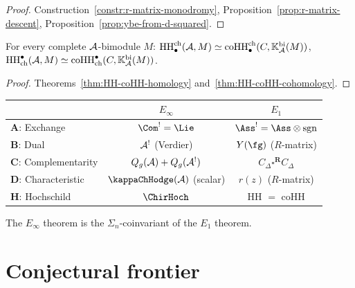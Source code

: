 \begin{proof}
Construction~\ref{constr:r-matrix-monodromy},
Proposition~\ref{prop:r-matrix-descent},
Proposition~\ref{prop:ybe-from-d-squared}.
\end{proof}

\begin{theorem}
For every complete $\mathcal{A}$-bimodule $M$\textup{:}
$\operatorname{HH}^{\mathrm{ch}}_\bullet(\mathcal{A}, M)
\simeq
\operatorname{coHH}^{\mathrm{ch}}_\bullet(C, \mathbb{K}_{\mathcal{A}}^{\mathrm{bi}}(M))$,\quad
$\operatorname{HH}_{\mathrm{ch}}^\bullet(\mathcal{A}, M)
\simeq
\operatorname{coHH}_{\mathrm{ch}}^\bullet(C, \mathbb{K}_{\mathcal{A}}^{\mathrm{bi}}(M))$.
\end{theorem}

\begin{proof}
Theorems~\ref{thm:HH-coHH-homology}
and~\ref{thm:HH-coHH-cohomology}.
\end{proof}

\begin{remark}[$E_1$ vs $E_\infty$]
\begin{center}
\renewcommand{\arraystretch}{1.15}
\begin{tabular}{lcc}
\toprule
& \emph{$E_\infty$} & \emph{$E_1$} \\
\midrule
\textbf{A}: Exchange
 & $\Com^! = \Lie$
 & $\Ass^! = \Ass \otimes \mathrm{sgn}$ \\
\textbf{B}: Dual
 & $\mathcal{A}^!$ (Verdier)
 & $Y(\fg)$ ($R$-matrix) \\
\textbf{C}: Complementarity
 & $Q_g(\mathcal{A}) + Q_g(\mathcal{A}^!)$
 & $C_\Delta \square^{\mathbf{R}} C_\Delta$ \\
\textbf{D}: Characteristic
 & $\kappaChHodge(\cA)$ (scalar)
 & $r(z)$ ($R$-matrix) \\
\textbf{H}: Hochschild
 & $\ChirHoch$
 & HH $=$ coHH \\
\bottomrule
\end{tabular}
\end{center}
The $E_\infty$ theorem is the $\Sigma_n$-coinvariant of the $E_1$ theorem.
\end{remark}


\section{Conjectural frontier}

